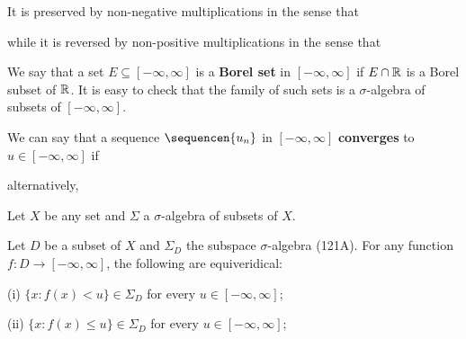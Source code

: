 \noindent It is preserved by non-negative multiplications in the sense
that


\noindent while it is reversed by non-positive multiplications in the
sense that


 We say that a
set $E\subseteq[-\infty,\infty]$ is a {\bf Borel set} in
$[-\infty,\infty]$ if $E\cap\Bbb R$ is a Borel subset of $\Bbb R$.
It is easy to check that the family of such sets is a
$\sigma$-algebra of subsets of  $[-\infty,\infty]$.  

\ifnum{}\ifresultsonly\eject\fi\fi

 We can say
that a sequence $\sequencen{u_n}$ in $[-\infty,\infty]$  {\bf converges}
to $u\in[-\infty,\infty]$ if


\noindent alternatively,





 Let $X$ be any set and $\Sigma$ a
$\sigma$-algebra of subsets of $X$.

 Let $D$ be a subset of $X$ and $\Sigma_D$ the
subspace $\sigma$-algebra (121A).   For any function
$f:D\to[-\infty,\infty]$, the following are equiveridical:

\quad (i) $\{x:f(x)<u\}\in\Sigma_D$ for every $u\in[-\infty,\infty]$;

\quad (ii) $\{x:f(x)\le u\}\in\Sigma_D$ for every
$u\in[-\infty,\infty]$;

